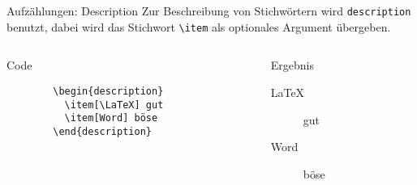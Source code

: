 \begin{frame}[fragile]{Aufzählungen: Description}
  Zur Beschreibung von Stichwörtern wird \texttt{description} benutzt, dabei wird das
Stichwort \verb-\item- als optionales Argument übergeben.
  \begin{columns}[onlytextwidth, t]
    \begin{column}{0.48\textwidth}
      \begin{block}{Code}
        \begin{lstlisting}
        \begin{description}
          \item[\LaTeX] gut
          \item[Word] böse
        \end{description}
        \end{lstlisting}
      \end{block}
    \end{column}
    \begin{column}{0.48\textwidth}
      \begin{block}{Ergebnis}
        \begin{description}
          \item[\LaTeX] gut
          \item[Word] böse
        \end{description}
      \end{block}
    \end{column}
  \end{columns}
\end{frame}
